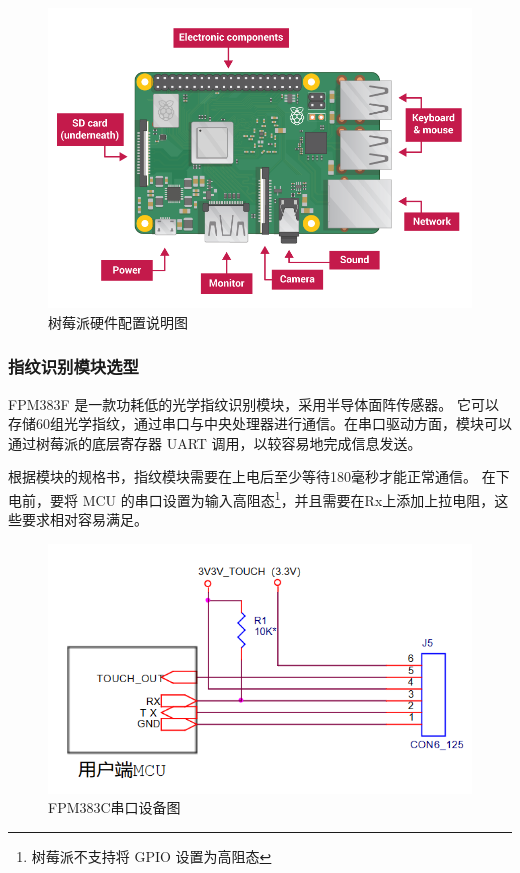 \begin{figure}[ht]
    \centering
    \includegraphics[width=\textwidth]{imgs/树莓派硬件配置说明图.png}
    \caption{树莓派硬件配置说明图}    \label{树莓派硬件配置说明图}
\end{figure}

\subsubsection{指纹识别模块选型}

FPM383F 是一款功耗低的光学指纹识别模块，采用半导体面阵传感器。
它可以存储60组光学指纹，通过串口与中央处理器进行通信。在串口驱动方面，模块可以通过树莓派的底层寄存器 UART 调用，以较容易地完成信息发送。

根据模块的规格书，指纹模块需要在上电后至少等待180毫秒才能正常通信。
在下电前，要将 MCU 的串口设置为输入高阻态\footnote{树莓派不支持将 GPIO 设置为高阻态}，并且需要在Rx上添加上拉电阻，这些要求相对容易满足。

\begin{figure}[ht]
    \centering
    \includegraphics[scale=0.6]{imgs/FPM383C串口设备图.png}
    \caption{FPM383C串口设备图}    \label{FPM383C串口设备图}
\end{figure}


